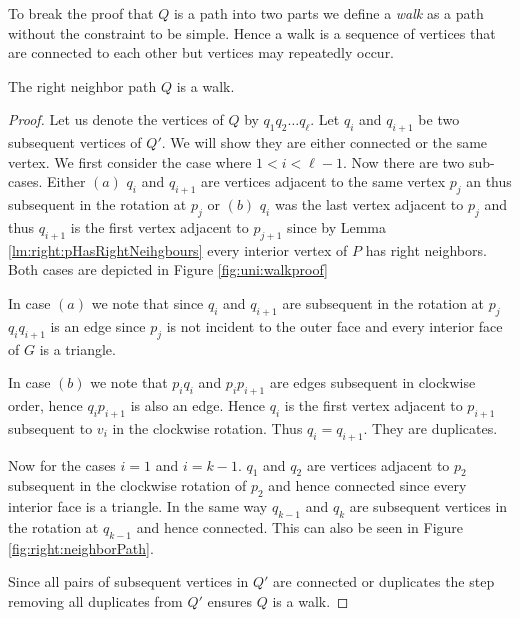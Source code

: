   To break the proof that $Q$ is a path into two parts we define a \emph{walk} as a path without the constraint to be simple. Hence a walk is a sequence of vertices that are connected to each other but vertices may repeatedly occur.
  \begin{lemma}
    \label{lm:uni:neighborWalk}
    The right neighbor path $Q$ is a walk.
  \end{lemma}
  \begin{proof}
    Let us denote the vertices of $Q$ by $q_1 q_2 \ldots q_\ell$.
    Let $q_i$ and $q_{i+1}$ be two subsequent vertices of $Q'$. We will show they are either connected or the same vertex. We first consider the case where $1 < i < \ell-1$.
    Now there are two sub-cases. Either $(a)$ $q_i$ and $ q_{i+1}$ are vertices adjacent to the same vertex $p_j$ an thus subsequent in the rotation at $p_j$ or $(b)$ $q_i$ was the last vertex adjacent to $p_j$ and thus $q_{i+1}$ is the first vertex adjacent to $p_{j+1}$ since by Lemma \ref{lm:right:pHasRightNeihgbours} every interior vertex of $P$ has right neighbors.
    Both cases are depicted in Figure \ref{fig:uni:walkproof}

    In case $(a)$ we note that since $q_i$ and $q_{i+1}$ are subsequent in the rotation at $p_j$ $q_i q_{i+1}$ is an edge since $p_j$ is not incident to the outer face and every interior face of $G$ is a triangle.

    In case $(b)$ we note that $p_i q_i$ and $p_i p_{i+1}$ are edges subsequent in clockwise order, hence $q_{i} p_{i+1}$ is also an edge. Hence $q_i$ is the first vertex adjacent to $p_{i+1}$ subsequent to $v_i$ in the clockwise rotation. Thus $q_{i} = q_{i+1}$. They are duplicates.

    Now for the cases $i=1$ and $i=k-1$. $q_1$ and $q_2$ are vertices adjacent to $p_{2}$ subsequent in the clockwise rotation of ${p_2}$ and hence connected since every interior face is a triangle. In the same way $q_{k-1}$ and $q_k$ are subsequent vertices in the rotation at $q_{k-1}$ and hence connected. This can also be seen in Figure \ref{fig:right:neighborPath}.

    Since all pairs of subsequent vertices in $Q'$ are connected or duplicates the step removing all duplicates from $Q'$ ensures $Q$ is a walk.


\end{proof}
